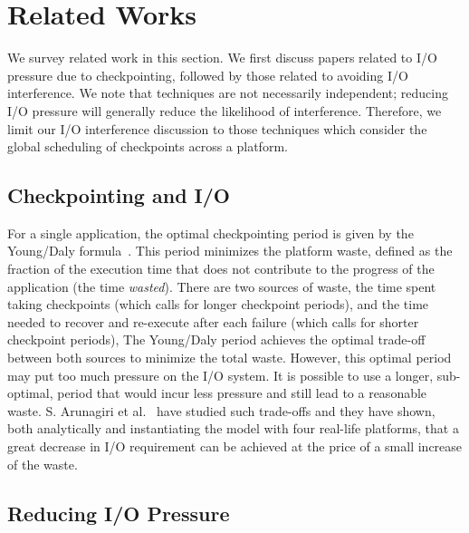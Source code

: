 

\section{Related Works}\label{sec:related}

We survey related work in this section. We first discuss papers related to I/O
pressure due to checkpointing, followed by those related to avoiding I/O
interference.  We note that techniques are not necessarily independent; reducing
I/O pressure will generally reduce the likelihood of interference.  Therefore,
we limit our I/O interference discussion to those techniques which consider the
global scheduling of checkpoints across a platform.


\subsection{Checkpointing and I/O}

For a single application, the optimal checkpointing period is given by the
Young/Daly formula~\cite{young74,daly04}. This period minimizes the platform
waste, defined as the fraction of the execution time that does not contribute
to the progress of the application (the time \emph{wasted}).  There are two
sources of waste, the time spent taking checkpoints (which calls for longer
checkpoint periods), and the time needed to recover and re-execute after each
failure (which calls for shorter checkpoint periods), The Young/Daly period
achieves the optimal trade-off between both sources to minimize the total
waste.  However, this optimal period may put too much pressure on the I/O
system. It is possible to use a longer, sub-optimal, period that would incur
less pressure and still lead to a reasonable waste. S. Arunagiri et
al.~\cite{Arunagiri2009} have studied such trade-offs and they have shown, both
analytically and instantiating the model with four real-life platforms, that a
great decrease in I/O requirement can be achieved  at the price of a small
increase of the waste.

\subsection{Reducing I/O Pressure}

